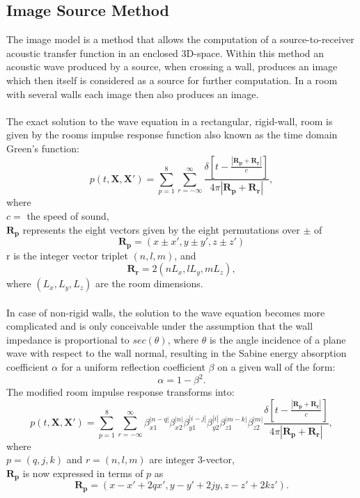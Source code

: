 \subsection{Image Source Method}
The image model is a method that allows the computation of a source-to-receiver acoustic transfer function in an enclosed 3D-space. Within this method an acoustic wave produced by a source, when crossing a wall, produces an image which then itself is considered as a source for further computation. In a room with several walls each image then also produces an image.\cite{Allen1979}
\\\\
The exact solution to the wave equation in a rectangular, rigid-wall, room is given by the rooms impulse response function also known as the time domain Green's function\cite{Allen1979}:
\begin{equation}
    p(t,\mathbf{X},\mathbf{X'})=\sum_{p=1}^8\sum_{r=-\infty}^\infty\frac{\delta[t-\frac{|\mathbf{R_p}+\mathbf{R_r}|}{c}]}{4\pi|\mathbf{R_p}+\mathbf{R_r}|},
\end{equation}
where\\ 
$c=$ the speed of sound,\\
$\mathbf{R_p}$ represents the eight vectors given by the eight permutations over $\pm$ of
\begin{equation}
    \mathbf{R_p}=(x\pm x', y\pm y', z\pm z')
\end{equation}
r is the integer vector triplet $(n,l,m)$, and
\begin{equation}
    \mathbf{R_r}=2(nL_x, lL_y, mL_z),
\end{equation}
where $(L_x, L_y, L_z)$ are the room dimensions.
\\
\\
In case of non-rigid walls, the solution to the wave equation becomes more complicated and is only conceivable under the assumption that the wall impedance is proportional to $sec(\theta)$, where $\theta$ is the angle incidence of a plane wave with respect to the wall normal, resulting in the Sabine energy absorption coefficient $\alpha$ for a uniform reflection coefficient $\beta$ on a given wall of the form\cite{Allen1979}:
\begin{equation}
    \alpha=1-\beta^2.
\end{equation}
The modified room impulse response transforms into:
\begin{equation}
    p(t,\mathbf{X},\mathbf{X'})=\sum_{p=1}^8\sum_{r=-\infty}^\infty
    \beta_{x1}^{|n-q|}\beta_{x2}^{|n|}\beta_{y1}^{|i-j|}\beta_{y2}^{|i|}\beta_{z1}^{|m-k|}\beta_{z2}^{|m|}
    \frac{\delta[t-\frac{|\mathbf{R_p}+\mathbf{R_r}|}{c}]}{4\pi|\mathbf{R_p}+\mathbf{R_r}|},
\end{equation}
where\\
$p=(q,j,k)$ and $r=(n,l,m)$ are integer 3-vector,\\
$\mathbf{R_p}$ is now expressed in terms of $p$ as
\begin{equation}
    \mathbf{R_p}=(x-x'+2qx', y-y'+2jy,z-z'+2kz').
\end{equation}


